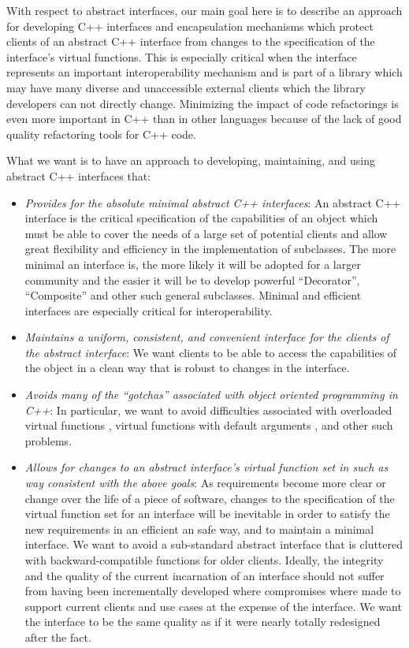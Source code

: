 \documentclass[pdf,ps2pdf,11pt]{SANDreport}
\begin{document}
With respect to abstract interfaces, our main goal here is to describe an
approach for developing C++ interfaces and encapsulation mechanisms which
protect clients of an abstract C++ interface from changes to the specification
of the interface's virtual functions.  This is especially critical when the
interface represents an important interoperability mechanism and is part of a
library which may have many diverse and unaccessible external clients which
the library developers can not directly change.  Minimizing the impact of code
refactorings is even more important in C++ than in other languages because of
the lack of good quality refactoring tools for C++ code.

What we want is to have an approach to developing, maintaining, and using
abstract C++ interfaces that:

\begin{itemize}

{}\item\textit{Provides for the absolute minimal abstract C++ interfaces}: An
abstract C++ interface is the critical specification of the capabilities of an
object which must be able to cover the needs of a large set of potential
clients and allow great flexibility and efficiency in the implementation of
subclasses.  The more minimal an interface is, the more likely it will be
adopted for a larger community and the easier it will be to develop powerful
``Decorator'', ``Composite'' and other such general subclasses.  Minimal and
efficient interfaces are especially critical for interoperability.

{}\item\textit{Maintains a uniform, consistent, and convenient interface for
the clients of the abstract interface}: We want clients to be able to access
the capabilities of the object in a clean way that is robust to changes in the
interface.

{}\item\textit{Avoids many of the ``gotchas'' associated with object oriented
programming in C++}: In particular, we want to avoid difficulties associated
with overloaded virtual functions {}\cite[Item 73]{C++Gotchas03}, virtual
functions with default arguments {}\cite[Item 37]{EffectiveC++3rd}, and other
such problems.

{}\item\textit{Allows for changes to an abstract interface's virtual function
set in such as way consistent with the above goals}: As requirements become
more clear or change over the life of a piece of software, changes to the
specification of the virtual function set for an interface will be inevitable
in order to satisfy the new requirements in an efficient an safe way, and to
maintain a minimal interface.  We want to avoid a sub-standard abstract
interface that is cluttered with backward-compatible functions for older
clients.  Ideally, the integrity and the quality of the current incarnation of
an interface should not suffer from having been incrementally developed where
compromises where made to support current clients and use cases at the expense
of the interface.  We want the interface to be the same quality as if it were
nearly totally redesigned after the fact.


\end{itemize}
\end{document}
